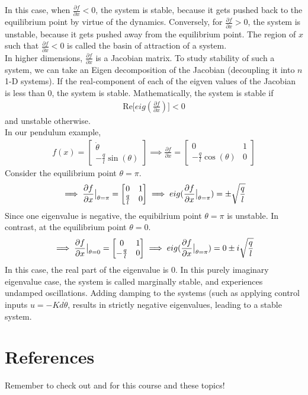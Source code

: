 \noindent
In this case, when $\frac{\partial f}{\partial x}<0$, the system is stable, because it gets pushed back to the equilibrium point by virtue of the dynamics. Conversely, for $\frac{\partial f}{\partial x}>0$, the system is unstable, because it gets pushed away from the equilibrium point.
The region of $x$ such that  $\frac{\partial f}{\partial x}<0$ is called the basin of attraction of a system.
\\

\noindent
In higher dimensions, $\frac{\partial f}{\partial x}$ is a Jacobian matrix. To study stability of such a system, we can take an Eigen decomposition of the Jacobian (decoupling it into $n$ 1-D systems). If the real-component of each of the eigven values of the Jacobian is less than $0$, the system is stable. Mathematically, the system is stable if
\begin{align}
    \textrm{Re} \big[ eig ( \frac{\partial f}{\partial x} ) \big] < 0 
\end{align}
and unstable otherwise. \\

\noindent
In our pendulum example, 
\begin{align}
    f(x) = \begin{bmatrix}
        \dot{\theta} \\
        - \frac{q}{l} \sin(\theta) 
    \end{bmatrix}
    \implies
    \frac{\partial f}{\partial x} = \begin{bmatrix}
        0 & 1 \\
        - \frac{q}{l} \cos(\theta) & 0
    \end{bmatrix}
\end{align}
Consider the equilibrium point $\theta=\pi$. 
\begin{align}
    \implies
        \evalat{\frac{\partial f}{\partial x}}{\theta=\pi} = \begin{bmatrix}
        0 & 1 \\
        \frac{q}{l} & 0
    \end{bmatrix}
    \implies
    eig(\evalat{\frac{\partial f}{\partial x}}{\theta=\pi}) = \pm \sqrt{\frac{q}{l}}
\end{align}
Since one eigenvalue is negative, the equibilrium point $\theta=\pi$ is unstable.
In contrast, at the equilibrium point $\theta=0$. 
\begin{align}
    \implies
        \evalat{\frac{\partial f}{\partial x}}{\theta=0} = \begin{bmatrix}
        0 & 1 \\
        - \frac{q}{l} & 0
    \end{bmatrix}
    \implies
    eig(\evalat{\frac{\partial f}{\partial x}}{\theta=\pi}) = 0 \pm i \sqrt{\frac{q}{l}}
\end{align}
In this case, the real part of the eigenvalue is $0$. In this purely imaginary eigenvalue case, the system is called marginally stable, and experiences undamped oscillations. 
Adding damping to the systems (such as applying control inputs $u = - K d \dot{\theta}$, results in strictly negative eigenvalues, leading to a stable system. 

\section{References}
Remember to check out \cite{spong2005robot} and \cite{strogatz2016nonlinear} for this course and these topics!

\printbibliography